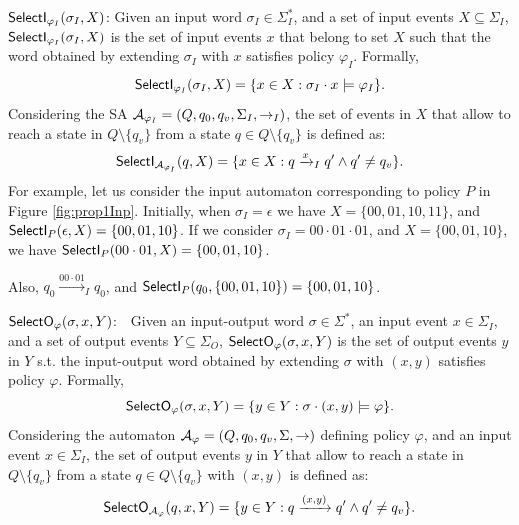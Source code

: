 \squishlist
\item {{\boldmath$\mathsf{SelectI}_{\varphi_{I}}(\sigma_I, X)$}}: Given an input word $\sigma_I\in\Sigma_I^*$, and a set of input events $X \subseteq \Sigma_I$, $\mathsf{SelectI}_{\varphi_{I}}(\sigma_I, X)$ is the set of input events $x$ that belong to set $X$ such that the word obtained by extending $\sigma_I$ with $x$ satisfies policy $\varphi_I$. Formally,
\[\mathsf{SelectI}_{\varphi_{I}}(\sigma_I, X) = \{ x\in X: \sigma_I \cdot x \models \varphi_I \}.\]
%
Considering the SA ${\cal A}_{\varphi_I}=(Q, q_0, q_v, \Sigma_I, \rightarrow_I)$,
the set of events in $X$ that allow to reach a state in $Q\setminus \{q_v\}$ from a state $q\in Q\setminus \{q_v\}$ is defined as:
\[\mathsf{SelectI}_{{\cal A}_{\varphi_I}}(q,X) = \{x\in X: q \xrightarrow{x}_I q' \wedge q' \neq q_v \}. \]
%
For example, let us consider the input automaton corresponding to policy $P$ in Figure \ref{fig:prop1Inp}.
Initially, when $\sigma_I = \epsilon$ we have $X = \{00,01,10,11\}$, and $\mathsf{SelectI}_{P}(\epsilon, X)= \{00,01,10\}$.
%
If we consider $\sigma_I = 00 \cdot 01 \cdot 01$, and  $X = \{00,01,10\}$, we have $\mathsf{SelectI}_{P}(00 \cdot 01, X)= \{00,01,10\}$.

Also, $q_0 \xrightarrow{00\cdot01}_I q_0$, and $\mathsf{SelectI}_{P}(q_0, \{00,01,10\}) = \{00,01,10\}$.








%
\item {\boldmath$\mathsf{SelectO}_\varphi(\sigma, x, Y)$}:~~Given an input-output word $\sigma\in\Sigma^*$, an input event $x\in\Sigma_I$, and a set of output events $Y \subseteq \Sigma_O$, $\mathsf{SelectO}_\varphi(\sigma, x, Y)$ is the set of output events $y$ in $Y$ s.t. the input-output word obtained by extending $\sigma$ with $(x,y)$ satisfies policy $\varphi$. Formally,
\[\mathsf{SelectO}_\varphi(\sigma,x, Y) = \{y \in Y: \sigma \cdot (x,y) \models \varphi \}.\]
%
Considering the automaton ${\cal A}_{\varphi}=(Q, q_0, q_v, \Sigma, \rightarrow)$ defining policy $\varphi$, and an input event $x\in\Sigma_I$,
the set of output events $y$ in $Y$ that allow to reach a state in $Q\setminus \{q_v\}$ from a state $q\in Q\setminus \{q_v\}$ with $(x,y)$ is defined as:
\[\mathsf{SelectO}_{{\cal A}_{\varphi}}(q,x, Y) = \{y \in Y: q \xrightarrow{(x,y)} q' \wedge q' \neq q_v \}. \]
%
\squishend

